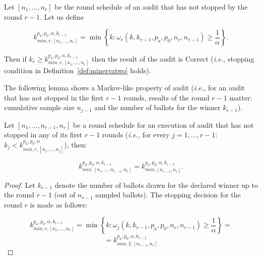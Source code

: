 \begin{definition} 
Let $[n_1, \ldots, n_r]$ be the round schedule of an audit that has not stopped by the round $r-1$. Let us define 
\begin{small}
\begin{equation}\label{eq:kMin}
k^{p_a, p_0, \alpha, k_{r-1}}_{min, r, [n_1, \ldots, n_r]} =
  \min\left\{k : \omega_r(k, k_{r-1},p_a,p_0,n_r, n_{r-1}) \geq \frac{1}{\alpha}  \right\}.
\end{equation}
\end{small}
Then if $k_r \geq k^{p_a, p_0, \alpha, k_{r-1}}_{min, r, [n_1, \ldots, n_r]}$ then the result of the audit is Correct (\textit{i.e.,} stopping condition in Definition~\ref{def:minervatwo} holds).
\end{definition}

The following lemma shows a Markov-like property of \Providence audit (\textit{i.e.,}
for an audit that has not stopped in the first $r-1$ rounds, results of the round $r-1$ matter: cumulative sample size $n_{j-1}$ and the number of ballots for the winner $k_{r-1}$).

\begin{lemma}\label{lemma:markov}
Let $[n_1, \ldots, n_{r-1}, n_r]$ be a round schedule for an execution of  \Providence audit that has not stopped
in any of its first $r-1$ rounds (\textit{i.e.,} for every $j = 1, \ldots, r-1$:
$k_j < k^{p_a, p_0, \alpha}_{min, r, [n_1, \ldots, n_j]}$), then: 

\[ 
k^{p_a, p_0, \alpha, k_{r-1}}_{min, [n_1, \ldots, n_{r-1}, n_r]} = k^{p_a, p_0, \alpha, k_{r-1}}_{min, [n_{r-1}, n_r]}.
\]
\end{lemma}
\begin{proof}
Let $k_{r-1}$ denote the number of ballots drawn for the declared winner up to the round $r-1$ (out of $n_{r-1}$ sampled ballots). The stopping decision for the round $r$ is made as follows:

\[
 k^{p_a, p_0, \alpha, k_{r-1}}_{min, r, [n_1, \ldots, n_r]} = \min\left\{k : \omega_{j}(k, k_{r-1}, p_a, p_0, n_r, n_{r-1}) \geq \frac{1}{\alpha}  \right\} = 
\]
\[
  =  k^{p_a, p_0, \alpha, k_{r-1}}_{min, 2, [n_{r-1}, n_r]}
\]

\end{proof}
